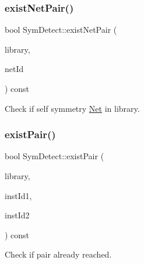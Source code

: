 \mbox{\label{classSymDetect_a04b449b545fe7d175e4733b3f602c41c}} 
\subsubsection{\texorpdfstring{exist\+Net\+Pair()}{existNetPair()}\hspace{0.1cm}{\footnotesize\ttfamily [2/2]}}
{\footnotesize\ttfamily bool Sym\+Detect\+::exist\+Net\+Pair (\begin{DoxyParamCaption}\item[{std\+::vector$<$ \hyperlink{classNetPair}{Net\+Pair} $>$ \&}]{library,  }\item[{\hyperlink{type_8h_a581e8093e28e7362f2b6937296190676}{Index\+Type}}]{net\+Id }\end{DoxyParamCaption}) const\hspace{0.3cm}{\ttfamily [private]}}



Check if self symmetry \hyperlink{classNet}{Net} in library. 

\mbox{\label{classSymDetect_a58ba284bb8522714804a192b2720cae3}} 
\subsubsection{\texorpdfstring{exist\+Pair()}{existPair()}\hspace{0.1cm}{\footnotesize\ttfamily [1/2]}}
{\footnotesize\ttfamily bool Sym\+Detect\+::exist\+Pair (\begin{DoxyParamCaption}\item[{const std\+::vector$<$ \hyperlink{classMosPair}{Mos\+Pair} $>$ \&}]{library,  }\item[{\hyperlink{type_8h_a581e8093e28e7362f2b6937296190676}{Index\+Type}}]{inst\+Id1,  }\item[{\hyperlink{type_8h_a581e8093e28e7362f2b6937296190676}{Index\+Type}}]{inst\+Id2 }\end{DoxyParamCaption}) const\hspace{0.3cm}{\ttfamily [private]}}



Check if pair already reached. 

